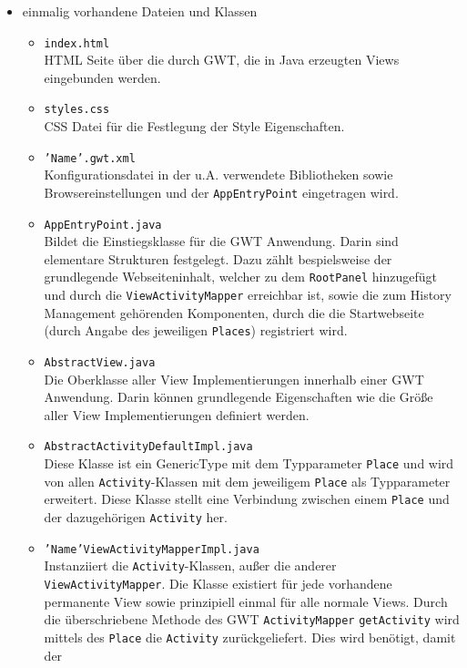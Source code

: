 \begin{itemize}
  \item einmalig vorhandene Dateien und Klassen
  \begin{itemize}
    \item \texttt{index.html}\\
    HTML Seite über die durch GWT, die in Java erzeugten Views
    eingebunden werden.
    \item \texttt{styles.css}\\
    CSS Datei für die Festlegung der Style Eigenschaften.
    \item \texttt{'Name'.gwt.xml}\\
    Konfigurationsdatei in der u.A. verwendete Bibliotheken sowie
    Browsereinstellungen und der \texttt{AppEntryPoint} eingetragen wird.
    \item \texttt{AppEntryPoint.java}\\
    Bildet die Einstiegsklasse für die GWT Anwendung. Darin sind elementare
    Strukturen festgelegt. Dazu zählt bespielsweise der grundlegende
    Webseiteninhalt, welcher zu dem \texttt{RootPanel} hinzugefügt und durch die
    \texttt{ViewActivityMapper} erreichbar ist, sowie die zum
    History Management gehörenden Komponenten, durch die die Startwebseite
    (durch Angabe des jeweiligen \texttt{Places}) registriert wird.
    \item \texttt{AbstractView.java}\\
    Die Oberklasse aller View Implementierungen innerhalb einer GWT
    Anwendung. Darin können grundlegende Eigenschaften wie die Größe aller
    View Implementierungen definiert werden.
    \item \texttt{AbstractActivityDefaultImpl.java}\\
    Diese Klasse ist ein GenericType mit dem Typparameter \texttt{Place} und
    wird von allen \texttt{Activity}-Klassen mit dem jeweiligem
    \texttt{Place} als Typparameter erweitert. 
 	Diese Klasse stellt eine Verbindung zwischen einem \texttt{Place} und der
 	dazugehörigen \texttt{Activity} her.
    \item \texttt{'Name'ViewActivityMapperImpl.java}\\
    Instanziiert die \texttt{Activity}-Klassen, außer die anderer
    \texttt{ViewActivityMapper}. Die Klasse existiert für jede vorhandene
    permanente View sowie prinzipiell einmal für alle normale
    Views. Durch die überschriebene Methode des GWT
    \texttt{ActivityMapper} \texttt{getActivity} wird mittels des \texttt{Place}
    die \texttt{Activity} zurückgeliefert. Dies wird benötigt, damit der

\end{itemize}
\end{itemize}
